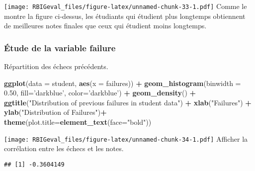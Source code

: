 \documentclass[
]{article}
\newenvironment{Shaded}{\begin{snugshade}}{\end{snugshade}}
\newcommand{\DataTypeTok}[1]{\textcolor[rgb]{0.13,0.29,0.53}{#1}}
\newcommand{\FloatTok}[1]{\textcolor[rgb]{0.00,0.00,0.81}{#1}}
\newcommand{\KeywordTok}[1]{\textcolor[rgb]{0.13,0.29,0.53}{\textbf{#1}}}
\newcommand{\NormalTok}[1]{#1}
\newcommand{\OperatorTok}[1]{\textcolor[rgb]{0.81,0.36,0.00}{\textbf{#1}}}
\newcommand{\StringTok}[1]{\textcolor[rgb]{0.31,0.60,0.02}{#1}}
\begin{document}
\texttt{[image: RBIGeval\_files/figure-latex/unnamed-chunk-33-1.pdf]}
Comme le montre la figure ci-dessus, les étudiants qui étudient plus
longtemps obtiennent de meilleures notes finales que ceux qui étudient
moins longtemps.

\hypertarget{uxe9tude-de-la-variable-failure}{%
\subsubsection{Étude de la variable
failure}\label{uxe9tude-de-la-variable-failure}}

Répartition des échecs précédents.

\begin{Shaded}
\begin{Highlighting}[]
\KeywordTok{ggplot}\NormalTok{(}\DataTypeTok{data =}\NormalTok{ student, }\KeywordTok{aes}\NormalTok{(}\DataTypeTok{x =}\NormalTok{ failures)) }\OperatorTok{+}
\StringTok{  }\KeywordTok{geom_histogram}\NormalTok{(}\DataTypeTok{binwidth =} \FloatTok{0.50}\NormalTok{, }\DataTypeTok{fill=}\StringTok{'darkblue'}\NormalTok{, }\DataTypeTok{color=}\StringTok{'darkblue'}\NormalTok{) }\OperatorTok{+}
\StringTok{  }\KeywordTok{geom_density}\NormalTok{() }\OperatorTok{+}
\StringTok{  }\KeywordTok{ggtitle}\NormalTok{(}\StringTok{"Distribution of previous failures in student data"}\NormalTok{) }\OperatorTok{+}
\StringTok{  }\KeywordTok{xlab}\NormalTok{(}\StringTok{"Failures"}\NormalTok{) }\OperatorTok{+}
\StringTok{  }\KeywordTok{ylab}\NormalTok{(}\StringTok{"Distribution of Failures"}\NormalTok{)}\OperatorTok{+}
\StringTok{  }\KeywordTok{theme}\NormalTok{(}\DataTypeTok{plot.title=}\KeywordTok{element_text}\NormalTok{(}\DataTypeTok{face=}\StringTok{"bold"}\NormalTok{))}
\end{Highlighting}
\end{Shaded}

\texttt{[image: RBIGeval\_files/figure-latex/unnamed-chunk-34-1.pdf]}
Afficher la corrélation entre les échecs et les notes.

\begin{Shaded}
\end{Shaded}

\begin{verbatim}
## [1] -0.3604149
\end{verbatim}
\end{document}
